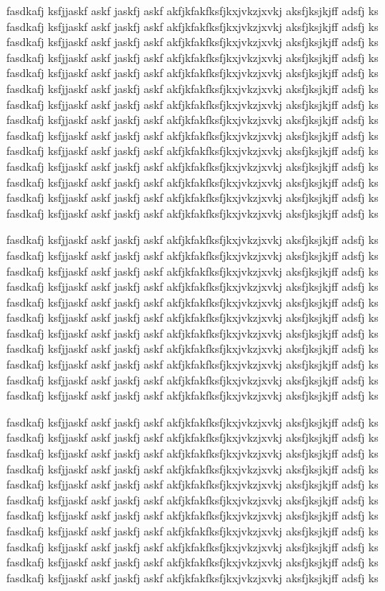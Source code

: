 \documentclass[a4paper,11pt,twocolumn]{article}
\begin{document}
fasdkafj ksfjjaskf askf jaskfj askf akfjkfakfksfjkxjvkzjxvkj aksfjksjkjff adsfj ks
fasdkafj ksfjjaskf askf jaskfj askf akfjkfakfksfjkxjvkzjxvkj aksfjksjkjff adsfj ks
fasdkafj ksfjjaskf askf jaskfj askf akfjkfakfksfjkxjvkzjxvkj aksfjksjkjff adsfj ks
fasdkafj ksfjjaskf askf jaskfj askf akfjkfakfksfjkxjvkzjxvkj aksfjksjkjff adsfj ks
fasdkafj ksfjjaskf askf jaskfj askf akfjkfakfksfjkxjvkzjxvkj aksfjksjkjff adsfj ks
fasdkafj ksfjjaskf askf jaskfj askf akfjkfakfksfjkxjvkzjxvkj aksfjksjkjff adsfj ks
fasdkafj ksfjjaskf askf jaskfj askf akfjkfakfksfjkxjvkzjxvkj aksfjksjkjff adsfj ks
fasdkafj ksfjjaskf askf jaskfj askf akfjkfakfksfjkxjvkzjxvkj aksfjksjkjff adsfj ks
fasdkafj ksfjjaskf askf jaskfj askf akfjkfakfksfjkxjvkzjxvkj aksfjksjkjff adsfj ks
fasdkafj ksfjjaskf askf jaskfj askf akfjkfakfksfjkxjvkzjxvkj aksfjksjkjff adsfj ks
fasdkafj ksfjjaskf askf jaskfj askf akfjkfakfksfjkxjvkzjxvkj aksfjksjkjff adsfj ks
fasdkafj ksfjjaskf askf jaskfj askf akfjkfakfksfjkxjvkzjxvkj aksfjksjkjff adsfj ks
fasdkafj ksfjjaskf askf jaskfj askf akfjkfakfksfjkxjvkzjxvkj aksfjksjkjff adsfj ks
fasdkafj ksfjjaskf askf jaskfj askf akfjkfakfksfjkxjvkzjxvkj aksfjksjkjff adsfj ks

fasdkafj ksfjjaskf askf jaskfj askf akfjkfakfksfjkxjvkzjxvkj aksfjksjkjff adsfj ks
fasdkafj ksfjjaskf askf jaskfj askf akfjkfakfksfjkxjvkzjxvkj aksfjksjkjff adsfj ks
fasdkafj ksfjjaskf askf jaskfj askf akfjkfakfksfjkxjvkzjxvkj aksfjksjkjff adsfj ks
fasdkafj ksfjjaskf askf jaskfj askf akfjkfakfksfjkxjvkzjxvkj aksfjksjkjff adsfj ks
fasdkafj ksfjjaskf askf jaskfj askf akfjkfakfksfjkxjvkzjxvkj aksfjksjkjff adsfj ks
fasdkafj ksfjjaskf askf jaskfj askf akfjkfakfksfjkxjvkzjxvkj aksfjksjkjff adsfj ks
fasdkafj ksfjjaskf askf jaskfj askf akfjkfakfksfjkxjvkzjxvkj aksfjksjkjff adsfj ks
fasdkafj ksfjjaskf askf jaskfj askf akfjkfakfksfjkxjvkzjxvkj aksfjksjkjff adsfj ks
fasdkafj ksfjjaskf askf jaskfj askf akfjkfakfksfjkxjvkzjxvkj aksfjksjkjff adsfj ks
fasdkafj ksfjjaskf askf jaskfj askf akfjkfakfksfjkxjvkzjxvkj aksfjksjkjff adsfj ks
fasdkafj ksfjjaskf askf jaskfj askf akfjkfakfksfjkxjvkzjxvkj aksfjksjkjff adsfj ks

fasdkafj ksfjjaskf askf jaskfj askf akfjkfakfksfjkxjvkzjxvkj aksfjksjkjff adsfj ks
fasdkafj ksfjjaskf askf jaskfj askf akfjkfakfksfjkxjvkzjxvkj aksfjksjkjff adsfj ks
fasdkafj ksfjjaskf askf jaskfj askf akfjkfakfksfjkxjvkzjxvkj aksfjksjkjff adsfj ks
fasdkafj ksfjjaskf askf jaskfj askf akfjkfakfksfjkxjvkzjxvkj aksfjksjkjff adsfj ks
fasdkafj ksfjjaskf askf jaskfj askf akfjkfakfksfjkxjvkzjxvkj aksfjksjkjff adsfj ks
fasdkafj ksfjjaskf askf jaskfj askf akfjkfakfksfjkxjvkzjxvkj aksfjksjkjff adsfj ks
fasdkafj ksfjjaskf askf jaskfj askf akfjkfakfksfjkxjvkzjxvkj aksfjksjkjff adsfj ks
fasdkafj ksfjjaskf askf jaskfj askf akfjkfakfksfjkxjvkzjxvkj aksfjksjkjff adsfj ks
fasdkafj ksfjjaskf askf jaskfj askf akfjkfakfksfjkxjvkzjxvkj aksfjksjkjff adsfj ks
fasdkafj ksfjjaskf askf jaskfj askf akfjkfakfksfjkxjvkzjxvkj aksfjksjkjff adsfj ks
fasdkafj ksfjjaskf askf jaskfj askf akfjkfakfksfjkxjvkzjxvkj aksfjksjkjff adsfj ks
\end{document}
